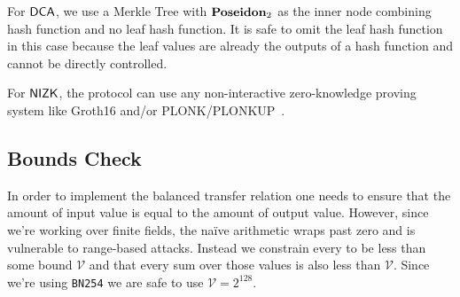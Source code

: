 \begin{definition}
    For ${\textsf{DCA}}$, we use a Merkle Tree with ${\textbf{Poseidon}}_2$ as the inner node combining hash function and no leaf hash function. It is safe to omit the leaf hash function in this case because the leaf values are already the outputs of a hash function and cannot be directly controlled.
\end{definition}

\begin{definition} \label{def:concrete-zkp}
    For ${\textsf{NIZK}}$, the protocol can use any non-interactive zero-knowledge proving system like Groth16 \cite{KRRS21USENIX} and/or PLONK/PLONKUP~\cite{plonk,plonkup}. 
\end{definition}

\subsection{\AssetValue{} Bounds Check}

In order to implement the balanced transfer relation one needs to ensure that the amount of input value is equal to the amount of output value. However, since we're working over finite fields, the na\"ive arithmetic wraps past zero and is vulnerable to range-based attacks. Instead we constrain every \AssetValue{} to be less than some bound $\mathcal{V}$ and that every sum over those values is also less than $\mathcal{V}$. Since we're using \texttt{BN254} we are safe to use $\mathcal{V} = 2^{128}$.
